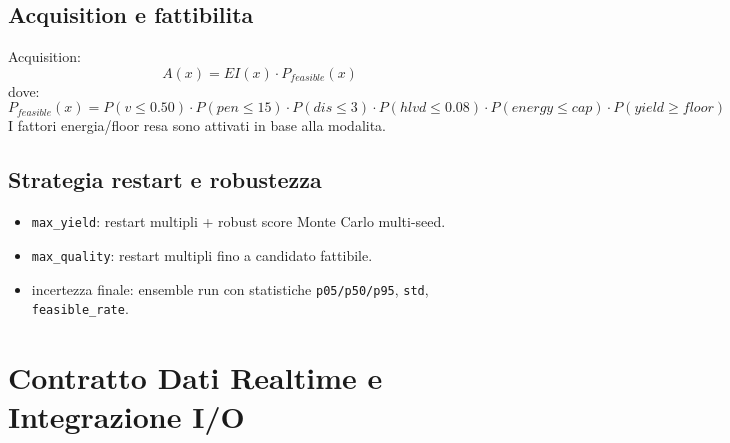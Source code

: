 ﻿\documentclass[11pt,a4paper]{report}
\begin{document}
\section{Acquisition e fattibilita}
Acquisition:
\[
A(x) = EI(x)\cdot P_{feasible}(x)
\]
dove:
\[
P_{feasible}(x)=P(v\le 0.50)\cdot P(pen\le 15)\cdot P(dis\le 3)\cdot P(hlvd\le 0.08)\cdot P(energy\le cap)\cdot P(yield\ge floor)
\]
I fattori energia/floor resa sono attivati in base alla modalita.

\section{Strategia restart e robustezza}
\begin{itemize}
  \item \texttt{max\_yield}: restart multipli + robust score Monte Carlo multi-seed.
  \item \texttt{max\_quality}: restart multipli fino a candidato fattibile.
  \item incertezza finale: ensemble run con statistiche \texttt{p05/p50/p95}, \texttt{std}, \texttt{feasible\_rate}.
\end{itemize}

\newpage
\chapter{Contratto Dati Realtime e Integrazione I/O}
\end{document}
